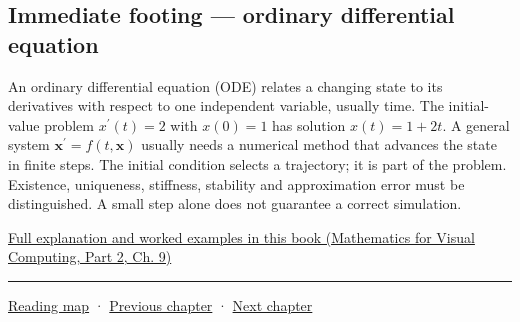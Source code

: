 \subsection{Immediate footing --- ordinary differential equation}\label{02-foundations-ii-ch021-immediate-footing-ordinary-differential-equation}

\hypertarget{02-foundations-ii-ch021-immediate-footing-ordinary-differential-equation}{}

An ordinary differential equation (ODE) relates a changing state to its derivatives with respect to one independent variable, usually time. The initial-value problem \(x^{\prime}(t)=2\) with \(x(0)=1\) has solution \(x(t)=1+2t\). A general system \(\mathbf x^{\prime}=f(t,\mathbf x)\) usually needs a numerical method that advances the state in finite steps. The initial condition selects a trajectory; it is part of the problem. Existence, uniqueness, stiffness, stability and approximation error must be distinguished. A small step alone does not guarantee a correct simulation.

\href{../02-Mathematics-for-Visual-Computing-P02/main.pdf\#nameddest=02-foundations-ii-ch025-odes-and-numerical-simulation}{Full explanation and worked examples in this book (Mathematics for Visual Computing, Part 2, Ch. 9)}

\begin{center}\rule{0.5\linewidth}{0.5pt}\end{center}

\hyperref[volume-reading-map]{Reading map} · \hyperref[01-foundations-i-ch020-choose-matrix-factorizations-from-structure]{Previous chapter} · \hyperref[02-foundations-ii-ch022-accumulation-quadrature-and-the-bridge-to-probability]{Next chapter}
